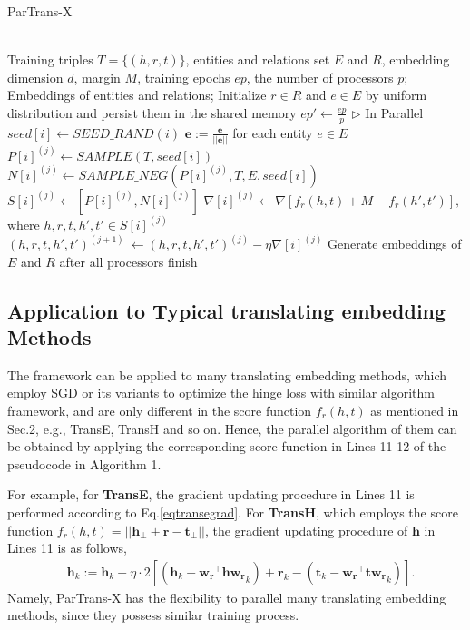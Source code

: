 \documentclass[sigconf]{acmart}
\begin{document}
\begin{algorithm}[htbp]
  \caption{ParTrans-X}
  \label{ParTrans-X}
  \begin{algorithmic}[1]
  \REQUIRE ~~\\
    Training triples $T=\{(h,r,t)\}$, entities and relations set $E$ and $R$, embedding dimension $d$, margin $M$, training epochs $ep$, the number of processors $p$;
  \ENSURE ~~ \\
     Embeddings of entities and relations;
  \STATE Initialize $r \in R$ and $e \in E$ by uniform distribution and persist them in the shared memory
   \STATE $ep' \gets \frac{ep}{p}$  \quad  \quad  \quad  \quad  \quad  \quad  \quad  \quad  \quad  \quad  \quad   \quad  \quad  \quad  $\triangleright$ In Parallel
\STATE $seed[i] \gets SEED\_RAND(i)$ 
\LOOP
    \STATE $\mathbf{e} := \frac{\mathbf{e}}{||\mathbf{e}||}$ for each entity $e \in E$
\STATE $P[i]^{(j)} \gets SAMPLE(T, seed[i])$\STATE $N[i]^{(j)} \gets SAMPLE\_NEG(P[i]^{(j)}, T, E, seed[i])$ \STATE $S[i]^{(j)} \gets \left[P[i]^{(j)},N[i]^{(j)}\right]$
\STATE $\nabla[i]^{(j)} \gets  \nabla[f_r(h,t)+M-f_r(h',t')],$ where $ h,r,t,h',t' \in S[i]^{(j)}$  \quad \STATE $(h,r,t,h',t')^{(j+1)}\ \gets (h,r,t,h',t')^{(j)} -\eta\nabla[i]^{(j)}$ \quad \ENDLOOP
  \ENDFOR
   \ENDFOR
    \STATE Generate embeddings of $E$ and $R$ after all processors finish
  \end{algorithmic}
\end{algorithm}


\subsection{Application to Typical translating embedding Methods}
The framework can be applied to many translating embedding methods,  which employ SGD or its variants to optimize the hinge loss with similar algorithm framework, and are only different in the score function $f_r(h,t)$ as mentioned in Sec.2, e.g., TransE, TransH and so on. Hence, the parallel algorithm of them can be obtained by applying the corresponding score function in Lines 11-12 of the pseudocode in Algorithm 1. 

For example, for \textbf{TransE}, the gradient updating procedure in Lines 11 is performed according to Eq.\eqref{eqtransegrad}. 
For \textbf{TransH}, which employs the score function $f_r(h,t)=||\mathbf{h_\bot}+\mathbf{r}-\mathbf{t_\bot}||$, the gradient updating procedure of $ \mathbf{h }$ in  Lines 11  is as follows,
\begin{align}
& \mathbf{h}_k := \mathbf{h }_k -\eta \cdot 2 \left[(\mathbf{h}_k -  \mathbf{w_r}^\top \mathbf{h} \mathbf{w_r}_k)+\mathbf{r}_k-(\mathbf{t}_k-  \mathbf{w_r}^\top \mathbf{t} \mathbf{w_r}_k) \right].
\end{align}
Namely,  ParTrans-X  has the flexibility to parallel many translating embedding methods, since they possess similar training process.
\end{document}
